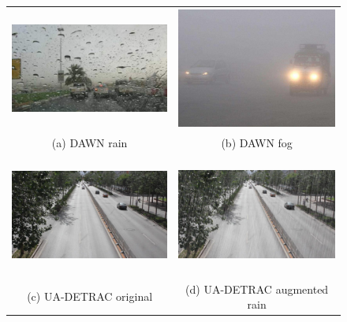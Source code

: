 \documentclass[]{article}
\begin{document}
  \begin{figure}
    \begin{tabular}{cc}
      \includegraphics[width=65mm, height=40mm]{dawn-train-fullres.png} &   \includegraphics[width=65mm, height=40mm]{dawn-fog.jpg} \\
      (a) DAWN rain & (b) DAWN fog  \\[6pt]
      \includegraphics[width=65mm, height=40mm]{detrac-orig.jpg} &   \includegraphics[width=65mm, height=40mm]{detrac-rain-fullres.png} \\
      (c) UA-DETRAC original  & (d) UA-DETRAC augmented rain \\[6pt]

\end{tabular}
\end{figure}
\end{document}
